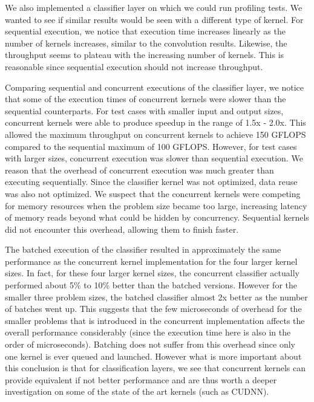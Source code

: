 \documentclass[sigconf]{acmart}
\begin{document}
We also implemented a classifier layer on which we could run profiling tests. We wanted to see if similar results would be seen with a different type of kernel. For sequential execution, we notice that execution time increases linearly as the number of kernels increases, similar to the convolution results. Likewise, the throughput seems to plateau with the increasing number of kernels. This is reasonable since sequential execution should not increase throughput.

Comparing sequential and concurrent executions of the classifier layer, we notice that some of the execution times of concurrent kernels were slower than the sequential counterparts. For test cases with smaller input and output sizes, concurrent kernels were able to produce speedup in the range of 1.5x - 2.0x. This allowed the maximum throughput on concurrent kernels to achieve 150 GFLOPS compared to the sequential maximum of 100 GFLOPS. However, for test cases with larger sizes, concurrent execution was slower than sequential execution. We reason that the overhead of concurrent execution was much greater than executing sequentially. Since the classifier kernel was not optimized, data reuse was also not optimized. We suspect that the concurrent kernels were competing for memory resources when the problem size became too large, increasing latency of memory reads beyond what could be hidden by concurrency. Sequential kernels did not encounter this overhead, allowing them to finish faster. 

The batched execution of the classifier resulted in approximately the same performance as the concurrent kernel implementation for the four larger kernel sizes. In fact, for these four larger kernel sizes, the concurrent classifier actually performed about 5\% to 10\% better than the batched versions. However for the smaller three problem sizes, the batched classifier almost 2x better as the number of batches went up. This suggests that the few microseconds of overhead for the smaller problems that is introduced in the concurrent implementation affects the overall performance considerably (since the execution time here is also in the order of microseconds). Batching does not suffer from this overhead since only one kernel is ever queued and launched. However what is more important about this conclusion is that for classification layers, we see that concurrent kernels can provide equivalent if not better performance and are thus worth a deeper investigation on some of the state of the art kernels (such as CUDNN).
\end{document}
